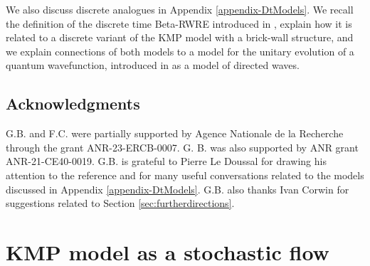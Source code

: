 \documentclass[a4paper,11pt,oneside,reqno]{amsart}
\theoremstyle{definition}
\numberwithin{equation}{section}
\begin{document}
 We also discuss discrete analogues in Appendix \ref{appendix-DtModels}. We recall the definition of the discrete time Beta-RWRE introduced in \cite{barraquand2015}, explain how it is related to a discrete variant of the KMP model with a brick-wall structure, and we explain connections of both models to a model for the unitary evolution of a quantum wavefunction, introduced in \cite{kardar1992} as a model of directed waves. 

 
 

\subsection*{Acknowledgments} G.B. and F.C. were partially supported by Agence Nationale de la Recherche through the grant ANR-23-ERCB-0007. G. B. was also  supported by ANR grant ANR-21-CE40-0019. G.B. is grateful to Pierre Le Doussal for drawing his attention to  the reference \cite{kardar1992} and for many useful conversations related to the models discussed in Appendix \ref{appendix-DtModels}. G.B. also thanks Ivan Corwin for suggestions related to Section \ref{sec:furtherdirections}.

\section{KMP model as a stochastic flow}\label{Section-KMP-SF-general}
\end{document}
